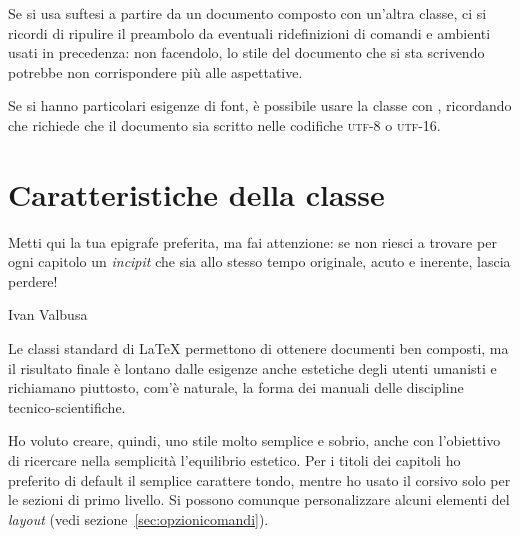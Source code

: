 \documentclass{suftesi}
\def\suftesi{\textsf{suftesi}}
\begin{document}
Se si usa \suftesi{} a partire da un documento composto con un'altra classe, ci si ricordi di ripulire il preambolo da eventuali ridefinizioni di comandi e ambienti usati in precedenza: non facendolo, lo stile del documento che si sta scrivendo  potrebbe non corrispondere più alle aspettative.
%

Se si hanno particolari esigenze di font, è possibile usare la classe con \XeLaTeX, ricordando che \XeLaTeX{} richiede che il documento sia scritto nelle codifiche \textsc{utf-8} o \textsc{utf-16}.




\mainmatter

\chapter{Caratteristiche della classe}
\begingroup 
\setlength{\epigraphwidth}{6cm}
\epigraph{Metti qui la tua epigrafe preferita, ma fai attenzione:
se non riesci a trovare per ogni capitolo un \emph{incipit} 
che sia allo stesso tempo originale, acuto e inerente, lascia perdere!}{Ivan Valbusa}
\endgroup

\chapterintro

Le classi standard di \LaTeX{} permettono di ottenere documenti ben composti, ma il risultato finale è lontano dalle esigenze anche estetiche degli utenti umanisti e richiamano piuttosto, com'è naturale, la forma dei manuali delle discipline tecnico-scientifiche.

Ho voluto creare, quindi, uno stile molto semplice e sobrio, anche con l'obiettivo di ricercare nella semplicità l'equilibrio estetico. Per i titoli dei capitoli ho preferito di default il semplice carattere tondo, mentre ho usato il corsivo solo per le sezioni di primo livello. Si possono comunque personalizzare alcuni elementi del \emph{layout} (vedi sezione~\ref{sec:opzionicomandi}).
 
\end{document}
